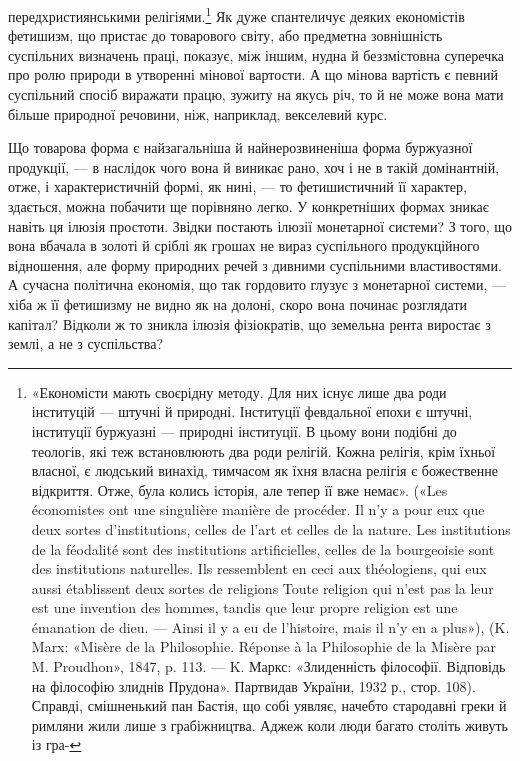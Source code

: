 передхристиянськими релігіями.\footnote{
«Економісти мають своєрідну методу. Для них існує лише два
роди інституцій — штучні й природні. Інституції февдальної епохи є
штучні, інституції буржуазні — природні інституції. В цьому вони
подібні до теологів, які теж встановлюють два роди релігій. Кожна релігія,
крім їхньої власної, є людський винахід, тимчасом як їхня власна
релігія є божественне відкриття. Отже, була колись історія, але тепер
її вже немає». («Les économistes ont une singulière manière de procéder.
Il n’y a pour eux que deux sortes d’institutions, celles de l’art et celles de
la nature. Les institutions de la féodalité sont des institutions artificielles,
celles de la bourgeoisie sont des institutions naturelles. Ils ressemblent
en ceci aux théologiens, qui eux aussi établissent deux sortes de religions
Toute religion qui n’est pas la leur est une invention des hommes, tandis
que leur propre religion est une émanation de dieu. — Ainsi il y a eu de
l’histoire, mais il n’y en a plus»), (K. Marx: «Misère de la Philosophie.
Réponse à la Philosophie de la Misère par M. Proudhon», 1847, p. 113. —
K. Маркс: «Злиденність філософії. Відповідь на філософію злиднів
Прудона». Партвидав України, 1932 р., стор. 108). Справді, смішненький
пан Бастія, що собі уявляє, начебто стародавні греки й римляни жили
лише з грабіжництва. Аджеж коли люди багато століть живуть із гра-
}
Як дуже спантеличує деяких економістів фетишизм, що пристає
до товарового світу, або предметна зовнішність суспільних
визначень праці, показує, між іншим, нудна й беззмістовна суперечка
про ролю природи в утворенні мінової вартости. А що
мінова вартість є певний суспільний спосіб виражати працю,
зужиту на якусь річ, то й не може вона мати більше природної
речовини, ніж, наприклад, векселевий курс.

Що товарова форма є найзагальніша й найнерозвиненіша
форма буржуазної продукції, — в наслідок чого вона й виникає
рано, хоч і не в такій домінантній, отже, і характеристичній
формі, як нині, — то фетишистичний її характер, здається, можна
побачити ще порівняно легко. У конкретніших формах зникає
навіть ця ілюзія простоти. Звідки постають ілюзії монетарної
системи? З того, що вона вбачала в золоті й сріблі як грошах не
вираз суспільного продукційного відношення, але форму природних
речей з дивними суспільними властивостями. А сучасна політична
економія, що так гордовито глузує з монетарної системи, —
хіба ж її фетишизму не видно як на долоні, скоро вона починає
розглядати капітал? Відколи ж то зникла ілюзія фізіократів,
що земельна рента виростає з землі, а не з суспільства?

